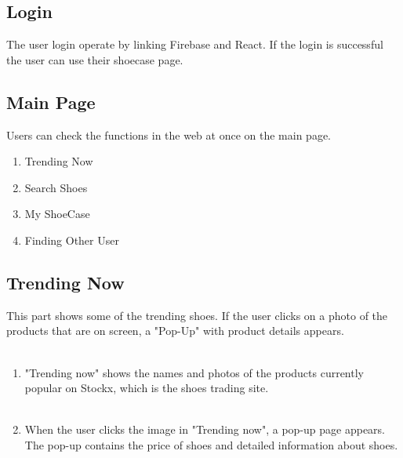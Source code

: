 \documentclass[conference]{IEEEtran}
\begin{document}
\subsection{Login}
The user login operate by linking Firebase and React. If the login is successful the user can use their shoecase page.\\

\subsection{Main Page}
Users can check the functions in the web at once on the main page. \\
\begin{enumerate}
    \item Trending Now\\
    \item Search Shoes\\
    \item My ShoeCase\\
    \item Finding Other User\\
\end{enumerate}

\subsection{Trending Now}
This part shows some of the trending shoes. If the user clicks on a photo of the products that are on screen, a "Pop-Up" with product details appears.\\\\
\begin{enumerate}
\item "Trending now" shows the names and photos of the products currently popular on Stockx, which is the shoes trading site.\\\\
\item When the user clicks the image in "Trending now", a pop-up page appears. The pop-up contains the price of shoes and detailed information about shoes.\\\\
\end{enumerate}
\end{document}

